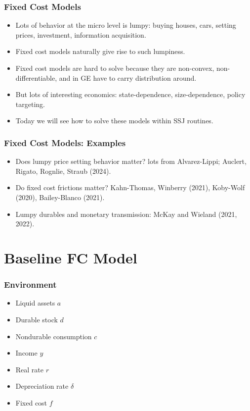 \documentclass[english,xcolor=svgnames]{beamer}
\begin{document}
\begin{frame}
    \frametitle{Fixed Cost Models}
    \begin{itemize}
        \item Lots of behavior at the micro level is lumpy: buying houses, cars, setting prices, investment, information acquisition.
        \item Fixed cost models naturally give rise to such lumpiness. 
        \item Fixed cost models are hard to solve because they are non-convex, non-differentiable, and in GE have to carry distribution around.
        \item But lots of interesting economics: state-dependence, size-dependence, policy targeting.
        \item Today we will see how to solve these models within SSJ routines.
    \end{itemize}
\end{frame}

\begin{frame}
    \frametitle{Fixed Cost Models: Examples}
    \begin{itemize}
        \item Does lumpy price setting behavior matter? lots from Alvarez-Lippi; Auclert, Rigato, Rognlie, Straub (2024).
        \item Do fixed cost frictions matter? Kahn-Thomas, Winberry (2021), Koby-Wolf (2020), Bailey-Blanco (2021).
        \item Lumpy durables and monetary transmission: McKay and Wieland (2021, 2022).
    \end{itemize}
\end{frame}


\section{Baseline FC Model}

\begin{frame}
    \frametitle{Environment}
    \begin{itemize}
        \item Liquid assets $a$
        \item Durable stock $d$
        \item Nondurable consumption $c$
        \item Income $y$
        \item Real rate $r$
        \item Depreciation rate $\delta$
        \item Fixed cost $f$
    \end{itemize}
\end{frame}
\end{document}
